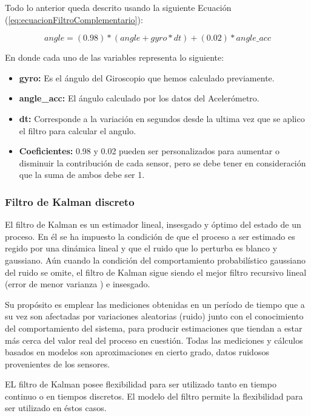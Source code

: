 \documentclass[12pt,a4paper]{article}
\begin{document}
Todo lo anterior queda descrito usando la siguiente Ecuación (\ref{eq:ecuacionFiltroComplementario}):

\begin{equation}
\label{eq:ecuacionFiltroComplementario}
angle = (0.98)*(angle+gyro*dt)+(0.02)*angle\_acc
\end{equation}

En donde cada uno de las variables representa lo siguiente:
\begin{itemize}
\item \textbf{gyro:} Es el ángulo del Giroscopio que hemos calculado previamente.
\item \textbf{angle\_acc:} El ángulo calculado por los datos del Acelerómetro.
\item \textbf{dt:} Corresponde a la variación en segundos desde la ultima vez que se aplico el filtro para calcular el angulo.
\item \textbf{Coeficientes:}  0.98 y 0.02 pueden ser personalizados para aumentar o disminuir la contribución de cada sensor, pero se debe tener en consideración que la suma de ambos debe ser 1.
\end{itemize}

\subsubsection{Filtro de Kalman discreto}
El filtro de Kalman es un estimador lineal, insesgado y óptimo del estado de un proceso. En él se ha impuesto la condición de que el proceso a ser estimado es regido por una dinámica lineal y que el ruido que lo perturba es blanco y gaussiano. Aún cuando la condición del comportamiento probabilístico gaussiano del ruido se omite, el filtro de Kalman sigue siendo el mejor filtro recursivo lineal (error de menor varianza ) e insesgado.

Su propósito es emplear las mediciones obtenidas en un período de tiempo que a su vez son afectadas por variaciones  aleatorias (ruido) junto con el conocimiento del comportamiento del sistema, para producir estimaciones que tiendan a estar más cerca del valor real del proceso en cuestión. Todas las mediciones y cálculos basados en modelos son aproximaciones en cierto grado, datos ruidosos provenientes de los sensores. 

EL filtro de Kalman posee flexibilidad para ser utilizado tanto en tiempo continuo o en tiempos discretos. El modelo del filtro permite la flexibilidad para ser utilizado en éstos casos.
\end{document}
